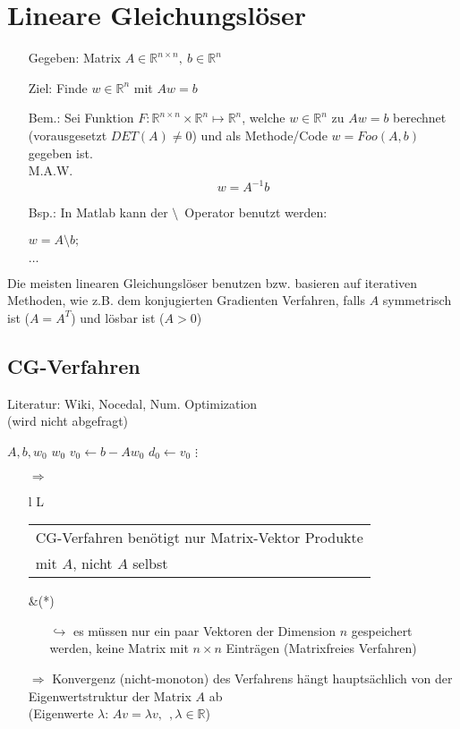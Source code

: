 \section{Lineare Gleichungslöser}
\label{chap:LGSsolvers}

\begin{itemize}
	\item[Gegeben:] Matrix $ A \in \mathbb{R}^{n\times n},\ b \in \mathbb{R}^n$
	\item[Ziel:] Finde $w\in \mathbb{R}^n$ mit $Aw=b$
	\item[Bem.:] Sei Funktion $F:\mathbb{R}^{n\times n} \times \mathbb{R}^n \mapsto \mathbb{R}^n$, welche $w \in \mathbb{R}^n$ zu $Aw=b$ berechnet (vorausgesetzt $DET(A) \neq 0$) und als Methode/Code $w=Foo(A,b)$ gegeben ist.\\
	M.A.W. $$w = A^{-1}b$$
	\item[Bsp.:] In Matlab kann der \glqq$\setminus$\grqq\  Operator benutzt werden:\\
	\begin{algorithmic}
		\State $w = A \setminus b;$
		\EndFunction
	\end{algorithmic}
$\dots$
\end{itemize}


Die meisten linearen Gleichungslöser benutzen bzw. basieren auf iterativen Methoden, wie z.B. dem konjugierten Gradienten Verfahren, falls $A$ symmetrisch ist ($A=A^T$) und lösbar ist ($A>0$)\\

\subsection{CG-Verfahren}
Literatur: Wiki, Nocedal, Num. Optimization\\
(wird nicht abgefragt)
\begin{algorithmic}
	\State $A,b,w_0$
	\State $w_0$
	\State $v_0 \gets b-Aw_0$
	\State $d_0 \gets v_0$
	\For{$k=0,1,\dots$}
		\State $\vdots$
	\EndFor
\end{algorithmic}
\begin{itemize}
	\item[$\Rightarrow$] \begin{tabular}{l L}\begin{tabular}{l}
		CG-Verfahren benötigt nur Matrix-Vektor Produkte\\
		mit $A$, nicht $A$ selbst
		\end{tabular}&(*)\\
		\end{tabular}
	\begin{itemize}
		\item[$\hookrightarrow$] es müssen nur ein paar Vektoren der Dimension $n$ gespeichert werden, keine Matrix mit $n\times n$ Einträgen (Matrixfreies Verfahren)
	\end{itemize}
	\item[$\Rightarrow$] Konvergenz (nicht-monoton) des Verfahrens hängt hauptsächlich von der Eigenwertstruktur der Matrix $A$ ab \\
	(Eigenwerte $\lambda$: $Av = \lambda v,\ \ , \lambda \in \mathbb{R}$)
\end{itemize}

